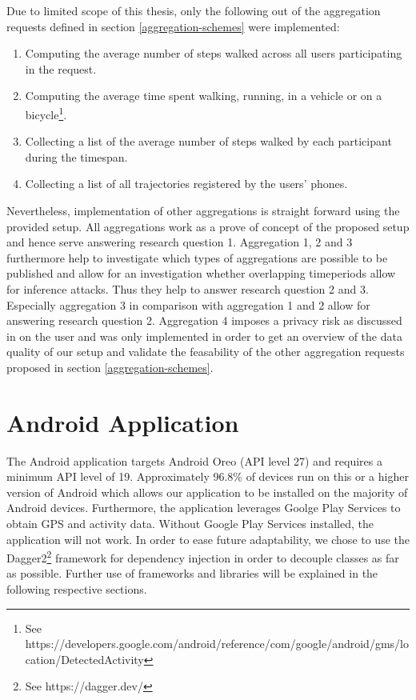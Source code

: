 \begin{samepage}
Due to limited scope of this thesis, only the following out of the aggregation requests defined in section \ref{aggregation-schemes} were implemented:
\begin{enumerate}
	\item Computing the average number of steps walked across all users participating in the request.
	\item Computing the average time spent walking, running, in a vehicle or on a bicycle\footnote{See https://developers.google.com/android/reference/com/google/android/gms/location/DetectedActivity}.
	\item Collecting a list of the average number of steps walked by each participant during the timespan.
	\item Collecting a list of all trajectories registered by the users' phones.
\end{enumerate}
\end{samepage}

Nevertheless, implementation of other aggregations is straight forward using the provided setup.
All aggregations work as a prove of concept of the proposed setup and hence serve answering research question 1. Aggregation 1, 2 and 3 furthermore help to investigate which types of aggregations are possible to be published and allow for an investigation whether overlapping timeperiods allow for inference attacks. Thus they help to answer research question 2 and 3. Especially aggregation 3 in comparison with aggregation 1 and 2 allow for answering research question 2.
Aggregation 4 imposes a privacy risk as discussed in \parencite{twitter, cellphone, krumm} on the user and was only implemented in order to get an overview of the data quality of our setup and validate the feasability of the other aggregation requests proposed in section \ref{aggregation-schemes}.

\section{Android Application}
The Android application targets Android Oreo (API level 27) and requires a minimum API level of 19. Approximately 96.8\% of devices run on this or a higher version of Android \cite{android-api-level-share} which allows our application to be installed on the majority of Android devices.
Furthermore, the application leverages Goolge Play Services to obtain GPS and activity data. Without Google Play Services installed, the application will not work. In order to ease future adaptability, we chose to use the Dagger2\footnote{See https://dagger.dev/} framework for dependency injection in order to decouple classes as far as possible. Further use of frameworks and libraries will be explained in the following respective sections.

